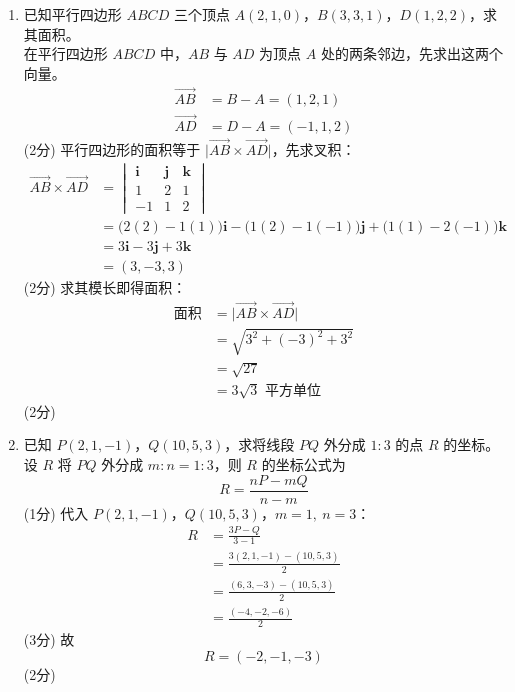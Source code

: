 \documentclass[12pt,a4paper]{exam-zh}
\newcommand{\solutionlayout}{%
    \setlength{\abovedisplayskip}{0.6em}%
    \setlength{\belowdisplayskip}{0.6em}%
    \setlength{\abovedisplayshortskip}{0.35em}%
    \setlength{\belowdisplayshortskip}{0.35em}%
    \setlength{\jot}{0.35em}%
}
\begin{document}
\begin{solution}
    \solutionlayout
    \begin{enumerate}[label=(\alph*),leftmargin=2.4em,itemsep=1em,topsep=0.5em,parsep=0.25em]
        \item 已知平行四边形 $ABCD$ 三个顶点 $A(2,1,0)$，$B(3,3,1)$，$D(1,2,2)$，求其面积。 \\
        在平行四边形 $ABCD$ 中，$AB$ 与 $AD$ 为顶点 $A$ 处的两条邻边，先求出这两个向量。
        \begin{align*}
            \overrightarrow{AB} &= B-A = (1,2,1) \\
            \overrightarrow{AD} &= D-A = (-1,1,2)
        \end{align*}
        \hfill (2分)
        平行四边形的面积等于 $\big|\overrightarrow{AB}\times\overrightarrow{AD}\big|$，先求叉积：
        \begin{align*}
            \overrightarrow{AB}\times\overrightarrow{AD}
            &= \begin{vmatrix} \mathbf{i} & \mathbf{j} & \mathbf{k} \\ 1 & 2 & 1 \\ -1 & 1 & 2 \end{vmatrix} \\
            &= \big(2(2)-1(1)\big)\mathbf{i} - \big(1(2)-1(-1)\big)\mathbf{j} + \big(1(1)-2(-1)\big)\mathbf{k} \\
            &= 3\mathbf{i}-3\mathbf{j}+3\mathbf{k} \\
            &= (3,-3,3)
        \end{align*}
        \hfill (2分)
        求其模长即得面积：
        \begin{align*}
            \text{面积} &= \big|\overrightarrow{AB}\times\overrightarrow{AD}\big| \\
            &= \sqrt{3^2+(-3)^2+3^2} \\
            &= \sqrt{27} \\
            &= 3\sqrt{3} \text{ 平方单位}
        \end{align*}
        \hfill (2分)

        \item 已知 $P(2,1,-1)$，$Q(10,5,3)$，求将线段 $PQ$ 外分成 $1:3$ 的点 $R$ 的坐标。 \\
        设 $R$ 将 $PQ$ 外分成 $m:n=1:3$，则 $R$ 的坐标公式为
        \[
            R=\frac{nP-mQ}{n-m}
        \]
        \hfill (1分)
        代入 $P(2,1,-1)$，$Q(10,5,3)$，$m=1,\ n=3$：
        \begin{align*}
            R &= \frac{3P-Q}{3-1} \\
            &= \frac{3(2,1,-1)-(10,5,3)}{2} \\
            &= \frac{(6,3,-3)-(10,5,3)}{2} \\
            &= \frac{(-4,-2,-6)}{2}
        \end{align*}
        \hfill (3分)
        故
        \[
            R=(-2,-1,-3)
        \]
        \hfill (2分)
    \end{enumerate}
\end{solution}
\end{document}
